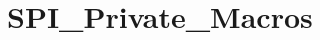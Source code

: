\hypertarget{group___s_p_i___private___macros}{\section{S\-P\-I\-\_\-\-Private\-\_\-\-Macros}
\label{group___s_p_i___private___macros}
}
